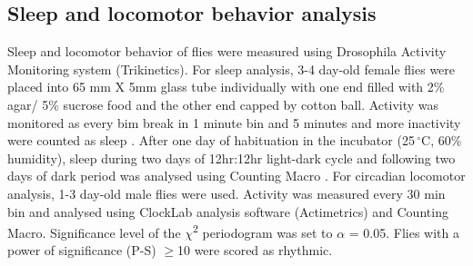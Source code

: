 \subsection*{Sleep and locomotor behavior analysis}

Sleep and locomotor behavior of flies were measured using Drosophila Activity Monitoring system (Trikinetics).
For sleep analysis, 3-4 day-old female flies were placed into 65 mm X 5mm glass tube individually with one end filled with 2\% agar/ 5\% sucrose food and the other end capped by cotton ball.
Activity was monitored as every bim break in 1 minute bin and 5 minutes and more inactivity were counted as sleep \cite{10710313}.
After one day of habituation in the incubator (25$\,^{\circ}\mathrm{C}$, 60\% humidity), sleep during two days of 12hr:12hr light-dark cycle and following two days of dark period was analysed using Counting Macro \cite{21041393}.
For circadian locomotor analysis, 1-3 day-old male flies were used. Activity was measured every 30 min bin and analysed using ClockLab analysis software (Actimetrics) and Counting Macro\cite{21041392}. Significance level of the $\chi$\textsuperscript{2} periodogram was set to $\alpha$ = 0.05.
Flies with a power of significance (P-S) $\geq$10 were scored as rhythmic.
  
  
  
  
  
  
  
  
  
  
  
  